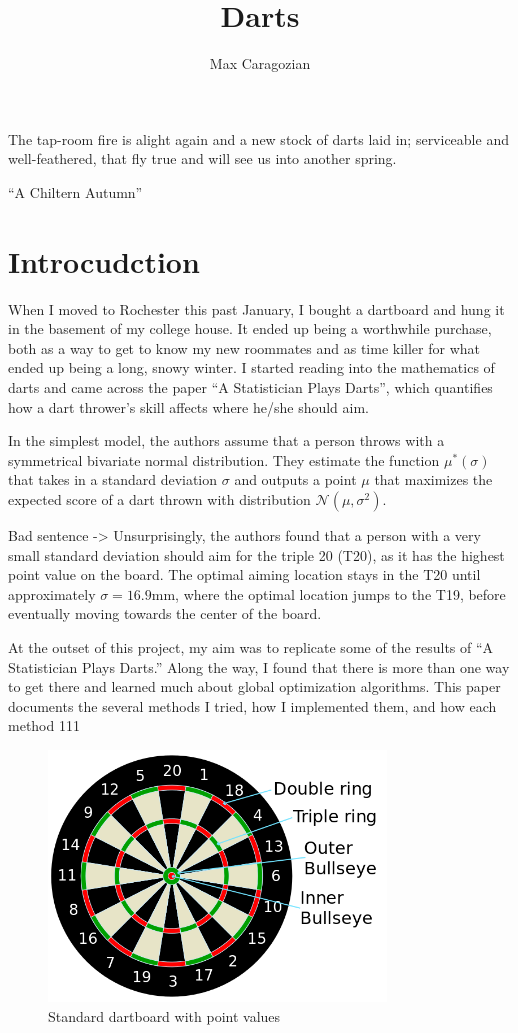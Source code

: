 \documentclass[]{article}
\title{Darts}
\author{Max Caragozian}
\begin{document}
\maketitle


\epigraph{The tap-room fire is alight again and a new stock of darts laid in; serviceable and well-feathered, that fly true and will see us into another spring.}{``A Chiltern Autumn'' \cite{1929spectator}}

\section{Introcudction}
When I moved to Rochester this past January, I bought a dartboard and hung it in the basement of my college house. It ended up being a worthwhile purchase, both as a way to get to know my new roommates and as time killer for what ended up being a long, snowy winter. I started reading into the mathematics of darts and came across the paper ``A Statistician Plays Darts''\cite{stat},  which quantifies how a dart thrower's skill affects where he/she should aim. 

In the simplest model, the authors assume that a person throws with a symmetrical bivariate normal distribution. They estimate the function $\mu^*(\sigma)$ that takes in a standard deviation $\sigma$ and outputs a point $\mu$ that maximizes the expected score of a dart thrown with distribution $\mathcal{N}(\mu, \sigma^2)$.

Bad sentence -> Unsurprisingly, the authors found that a person with a very small standard deviation should aim for the triple 20 (T20), as it has the highest point value on the board. The optimal aiming location stays in the T20 until approximately $\sigma=16.9$mm, where the optimal location jumps to the T19, before eventually moving towards the center of the board.

At the outset of this project, my aim was to replicate some of the results of ``A Statistician Plays Darts.''\cite{stat} Along the way, I found that there is more than one way to get there and learned much about global optimization algorithms. This paper documents the several methods I tried, how I implemented them, and how each method 111

\begin{figure}
	\centering
	\includegraphics[width=0.8\textwidth]{../images/dartboard_diagram.png}
	\caption{Standard dartboard with point values \cite{diag}}
	\label{fig:diag}
\end{figure}
\end{document}
